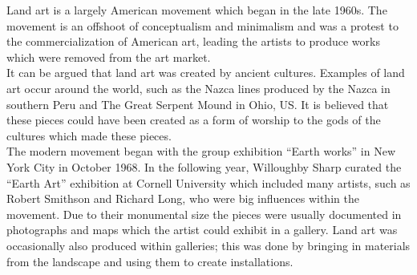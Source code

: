     Land art is a largely American movement which began in the late 1960s. The movement is an offshoot of conceptualism and minimalism and was a protest to the commercialization of American art, leading the artists to produce works which were removed from the art market.\\
    It can be argued that land art was created by ancient cultures. Examples of land art occur around the world, such as the Nazca lines produced by the Nazca in southern Peru and The Great Serpent Mound in Ohio, US. It is believed that these pieces could have been created as a form of worship to the gods of the cultures which made these pieces.\\
    The modern movement began with the group exhibition ``Earth works'' in New York City in October 1968. In the following year, Willoughby Sharp curated the ``Earth Art'' exhibition at Cornell University which included many artists, such as Robert Smithson and Richard Long, who were big influences within the movement. Due to their monumental size the pieces were usually documented in photographs and maps which the artist could exhibit in a gallery. Land art was occasionally also produced within galleries; this was done by bringing in materials from the landscape and using them to create installations.\\


